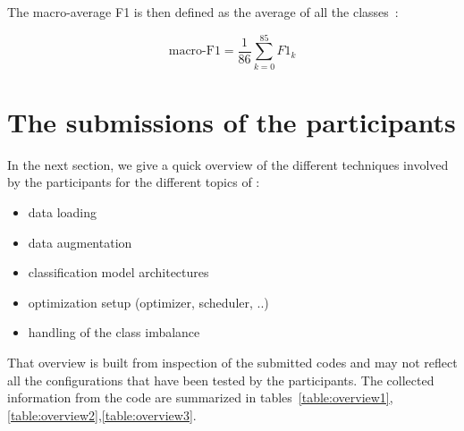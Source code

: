 \documentclass{article}
\begin{document}
The macro-average F1 is then defined as the average of all the classes~:

\begin{equation}
	\mbox{macro-F1} = \frac{1}{86}\sum_{k=0}^{85} F1_k
\end{equation}

\section{The submissions of the participants}

In the next section, we give a quick overview of the different techniques involved by the participants for the different topics of : 

\begin{itemize}
	\item data loading 
	\item data augmentation
	\item classification model architectures
	\item optimization setup (optimizer, scheduler, ..)
	\item handling of the class imbalance
\end{itemize}

That overview is built from inspection of the submitted codes and may not reflect all the configurations that have been tested by the participants. The collected information from the code are summarized in tables~\ref{table:overview1},\ref{table:overview2},\ref{table:overview3}.
\end{document}
